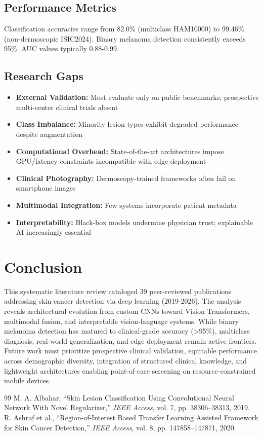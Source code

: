 \documentclass[10pt,twocolumn]{article}
\begin{document}
\subsection{Performance Metrics}
Classification accuracies range from 82.0\% (multiclass HAM10000) to 99.46\% (non-dermoscopic ISIC2024). Binary melanoma detection consistently exceeds 95\%. AUC values typically 0.88-0.99.

\subsection{Research Gaps}
\begin{itemize}[noitemsep]
\item \textbf{External Validation:} Most evaluate only on public benchmarks; prospective multi-center clinical trials absent
\item \textbf{Class Imbalance:} Minority lesion types exhibit degraded performance despite augmentation
\item \textbf{Computational Overhead:} State-of-the-art architectures impose GPU/latency constraints incompatible with edge deployment
\item \textbf{Clinical Photography:} Dermoscopy-trained frameworks often fail on smartphone images
\item \textbf{Multimodal Integration:} Few systems incorporate patient metadata
\item \textbf{Interpretability:} Black-box models undermine physician trust; explainable AI increasingly essential
\end{itemize}

\section{Conclusion}

This systematic literature review cataloged 39 peer-reviewed publications addressing skin cancer detection via deep learning (2019-2026). The analysis reveals architectural evolution from custom CNNs toward Vision Transformers, multimodal fusion, and interpretable vision-language systems. While binary melanoma detection has matured to clinical-grade accuracy (>95\%), multiclass diagnosis, real-world generalization, and edge deployment remain active frontiers. Future work must prioritize prospective clinical validation, equitable performance across demographic diversity, integration of structured clinical knowledge, and lightweight architectures enabling point-of-care screening on resource-constrained mobile devices.

\begin{thebibliography}{99}
 M. A. Albahar, ``Skin Lesion Classification Using Convolutional Neural Network With Novel Regularizer,'' \textit{IEEE Access}, vol. 7, pp. 38306--38313, 2019.
 R. Ashraf et al., ``Region-of-Interest Based Transfer Learning Assisted Framework for Skin Cancer Detection,'' \textit{IEEE Access}, vol. 8, pp. 147858--147871, 2020.
\end{thebibliography}
\end{document}
